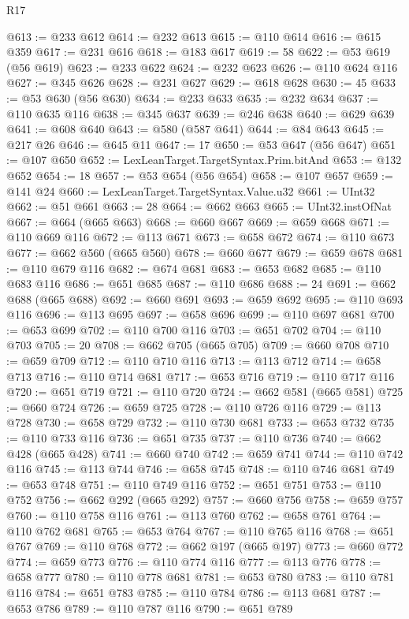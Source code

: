 \begin{lexlean}{R17}
\begin{coremodule}
{{{{{{{{{{{{{{{{{{{{{{{{{{{{{{{{{{{{{{{{{{{{{{{{{{{{{{{{{{{{{{{{{{{{{{{{{{{{{{{{{{{{{@613 := @233 @612
@614 := @232 @613
@615 := @110 @614
@616 := @615 @359
@617 := @231 @616
@618 := @183 @617
@619 := 58
@622 := @53 @619 (@56 @619)
@623 := @233 @622
@624 := @232 @623
@626 := @110 @624 @116
@627 := @345 @626
@628 := @231 @627
@629 := @618 @628
@630 := 45
@633 := @53 @630 (@56 @630)
@634 := @233 @633
@635 := @232 @634
@637 := @110 @635 @116
@638 := @345 @637
@639 := @246 @638
@640 := @629 @639
@641 := @608 @640
@643 := @580 (@587 @641)
@644 := @84 @643
@645 := @217 @26
@646 := @645 @11
@647 := 17
@650 := @53 @647 (@56 @647)
@651 := @107 @650
@652 := LexLeanTarget.TargetSyntax.Prim.bitAnd
@653 := @132 @652
@654 := 18
@657 := @53 @654 (@56 @654)
@658 := @107 @657
@659 := @141 @24
@660 := LexLeanTarget.TargetSyntax.Value.u32
@661 := UInt32
@662 := @51 @661
@663 := 28
@664 := @662 @663
@665 := UInt32.instOfNat
@667 := @664 (@665 @663)
@668 := @660 @667
@669 := @659 @668
@671 := @110 @669 @116
@672 := @113 @671
@673 := @658 @672
@674 := @110 @673
@677 := @662 @560 (@665 @560)
@678 := @660 @677
@679 := @659 @678
@681 := @110 @679 @116
@682 := @674 @681
@683 := @653 @682
@685 := @110 @683 @116
@686 := @651 @685
@687 := @110 @686
@688 := 24
@691 := @662 @688 (@665 @688)
@692 := @660 @691
@693 := @659 @692
@695 := @110 @693 @116
@696 := @113 @695
@697 := @658 @696
@699 := @110 @697 @681
@700 := @653 @699
@702 := @110 @700 @116
@703 := @651 @702
@704 := @110 @703
@705 := 20
@708 := @662 @705 (@665 @705)
@709 := @660 @708
@710 := @659 @709
@712 := @110 @710 @116
@713 := @113 @712
@714 := @658 @713
@716 := @110 @714 @681
@717 := @653 @716
@719 := @110 @717 @116
@720 := @651 @719
@721 := @110 @720
@724 := @662 @581 (@665 @581)
@725 := @660 @724
@726 := @659 @725
@728 := @110 @726 @116
@729 := @113 @728
@730 := @658 @729
@732 := @110 @730 @681
@733 := @653 @732
@735 := @110 @733 @116
@736 := @651 @735
@737 := @110 @736
@740 := @662 @428 (@665 @428)
@741 := @660 @740
@742 := @659 @741
@744 := @110 @742 @116
@745 := @113 @744
@746 := @658 @745
@748 := @110 @746 @681
@749 := @653 @748
@751 := @110 @749 @116
@752 := @651 @751
@753 := @110 @752
@756 := @662 @292 (@665 @292)
@757 := @660 @756
@758 := @659 @757
@760 := @110 @758 @116
@761 := @113 @760
@762 := @658 @761
@764 := @110 @762 @681
@765 := @653 @764
@767 := @110 @765 @116
@768 := @651 @767
@769 := @110 @768
@772 := @662 @197 (@665 @197)
@773 := @660 @772
@774 := @659 @773
@776 := @110 @774 @116
@777 := @113 @776
@778 := @658 @777
@780 := @110 @778 @681
@781 := @653 @780
@783 := @110 @781 @116
@784 := @651 @783
@785 := @110 @784
@786 := @113 @681
@787 := @653 @786
@789 := @110 @787 @116
@790 := @651 @789
}}}}}}}}}}}}}}}}}}}}}}}}}}}}}}}}}}}}}}}}}}}}}}}}}}}}}}}}}}}}}}}}}}}}}}}}}}}}}}}}}}}}}
\end{coremodule}
\end{lexlean}

